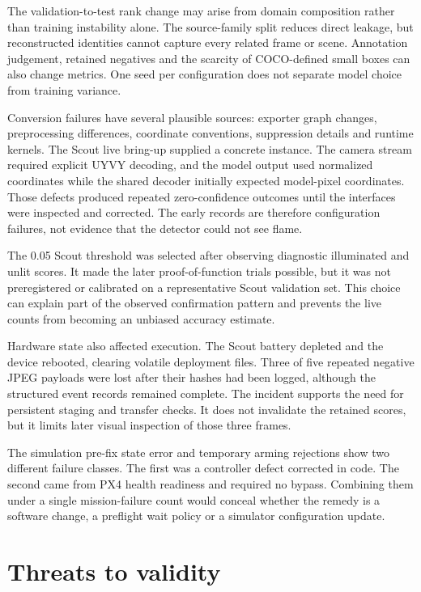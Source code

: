 The validation-to-test rank change may arise from domain composition rather
than training instability alone. The source-family split reduces direct
leakage, but reconstructed identities cannot capture every related frame or
scene. Annotation judgement, retained negatives and the scarcity of
COCO-defined small boxes can also change metrics. One seed per configuration
does not separate model choice from training variance.

Conversion failures have several plausible sources: exporter graph changes,
preprocessing differences, coordinate conventions, suppression details and
runtime kernels. The Scout live bring-up supplied a concrete instance. The
camera stream required explicit UYVY decoding, and the model output used
normalized coordinates while the shared decoder initially expected model-pixel
coordinates. Those defects produced repeated zero-confidence outcomes until
the interfaces were inspected and corrected. The early records are therefore
configuration failures, not evidence that the detector could not see flame.

The 0.05 Scout threshold was selected after observing diagnostic illuminated
and unlit scores. It made the later proof-of-function trials possible, but it
was not preregistered or calibrated on a representative Scout validation set.
This choice can explain part of the observed confirmation pattern and prevents
the live counts from becoming an unbiased accuracy estimate.

Hardware state also affected execution. The Scout battery depleted and the
device rebooted, clearing volatile deployment files. Three of five repeated
negative JPEG payloads were lost after their hashes had been logged, although
the structured event records remained complete. The incident supports the need
for persistent staging and transfer checks. It does not invalidate the retained
scores, but it limits later visual inspection of those three frames.

The simulation pre-fix state error and temporary arming rejections show two
different failure classes. The first was a controller defect corrected in code.
The second came from PX4 health readiness and required no bypass. Combining
them under a single mission-failure count would conceal whether the remedy is a
software change, a preflight wait policy or a simulator configuration update.

\section{Threats to validity}
\label{sec:discussion:5}

